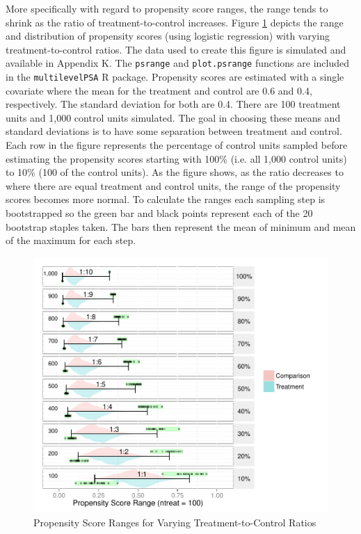 \documentclass[letterpaper,12p,twoside]{article} %
\begin{document}
More specifically with regard to propensity score ranges, the range tends to shrink as the ratio of treatment-to-control increases. Figure \ref{fig:psranges} depicts the range and distribution of propensity scores (using logistic regression) with varying treatment-to-control ratios. The data used to create this figure is simulated and available in Appendix K. The \texttt{psrange} and \texttt{plot.psrange} functions are included in the \texttt{multilevelPSA} R package. Propensity scores are estimated with a single covariate where the mean for the treatment and control are 0.6 and 0.4, respectively. The standard deviation for both are 0.4. There are 100 treatment units and 1,000 control units simulated. The goal in choosing these means and standard deviations is to have some separation between treatment and control. Each row in the figure represents the percentage of control units sampled before estimating the propensity scores starting with 100\% (i.e. all 1,000 control units) to 10\% (100 of the control units). As the figure shows, as the ratio decreases to where there are equal treatment and control units, the range of the propensity scores becomes more normal. To calculate the ranges each sampling step is bootstrapped so the green bar and black points represent each of the 20 bootstrap staples taken. The bars then represent the mean of minimum and mean of the maximum for each step.

\begin{figure}[t]
\begin{center}
\includegraphics[width=\textwidth]{../Figures2009/PSRanges.pdf}
\caption{Propensity Score Ranges for Varying Treatment-to-Control Ratios}
\label{fig:psranges}
\end{center}
\end{figure}
\end{document}
